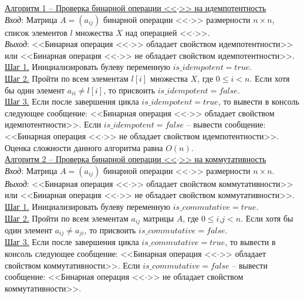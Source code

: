 \documentclass[bachelor, och, labwork]{shiza}
\begin{document}
        \underline{Алгоритм 1 -- Проверка бинарной операции <<$\cdot$>> на идемпотентность}\\
            \textit{Вход}: Матрица $A = (a_{ij})$ бинарной операции <<$\cdot$>> размерности $n \times n$, список элементов $l$ множества $X$ над
            операцией <<$\cdot$>>.\\
            \textit{Выход}: <<Бинарная операция <<$\cdot$>> обладает свойством идемпотентности>> или 
            <<Бинарная операция <<$\cdot$>> не обладает свойством идемпотентности>>.\\
            \underline{Шаг 1.} Инициализировать булеву переменную $is\_idempotent = true$.\\
            \underline{Шаг 2.} Пройти по всем элементам $l[i]$ множества $X$, где $0 \leq i < n$. Если хотя бы один 
            элемент $a_{ii} \neq l[i]$, то присвоить $is\_idempotent = false$.\\            
            \underline{Шаг 3.} Если после завершения цикла $is\_idempotent = true$, то вывести в консоль следующее сообщение:
            <<Бинарная операция <<$\cdot$>> обладает свойством идемпотентности>>. Если $is\_idempotent = false$ -- вывести сообщение:
            <<Бинарная операция <<$\cdot$>> не обладает свойством идемпотентности>>.\\
            
            Оценка сложности данного алгоритма равна $O(n)$.\\

        \underline{Алгоритм 2 -- Проверка бинарной операции <<$\cdot$>> на коммутативность}\\
            \textit{Вход}: Матрица $A = (a_{ij})$ бинарной операции <<$\cdot$>> размерности $n \times n$.\\
            \textit{Выход}: <<Бинарная операция <<$\cdot$>> обладает свойством коммутативности>> или 
            <<Бинарная операция <<$\cdot$>> не обладает свойством коммутативности>>.\\
            \underline{Шаг 1.} Инициализировать булеву переменную $is\_commutative = true$.\\
            \underline{Шаг 2.} Пройти по всем элементам $a_{ij}$ матрицы $A$, где $0 \leq i$,$j < n$. Если хотя бы один 
            элемент $a_{ij} \neq a_{ji}$, то присвоить $is\_commutative = false$.\\            
            \underline{Шаг 3.} Если после завершения цикла $is\_commutative = true$, то вывести в консоль следующее сообщение:
            <<Бинарная операция <<$\cdot$>> обладает свойством коммутативности>>. Если $is\_commutative = false$ -- вывести сообщение:
            <<Бинарная операция <<$\cdot$>> не обладает свойством коммутативности>>.\\
            
\end{document}
